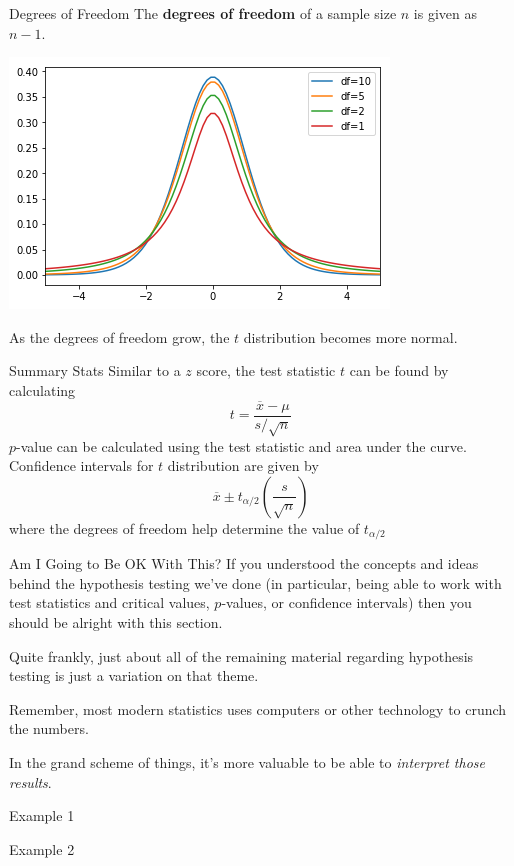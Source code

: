 \documentclass[t]{beamer}
\begin{document}
\begin{frame}{Degrees of Freedom}
The \textbf{degrees of freedom} of a sample size $n$ is given as $n - 1$.	\pause

\begin{center}
\includegraphics[scale=0.6]{../Images/t_distribution_df.png}
\end{center}
\pause

As the degrees of freedom grow, the $t$ distribution becomes more normal.
\end{frame}

\begin{frame}{Summary Stats}
Similar to a $z$ score, the test statistic $t$ can be found by calculating
\[t = \frac{\overline{x}-\mu}{s/\sqrt{n}}\]
\pause
$p$-value can be calculated using the test statistic and area under the curve. \newline\\	\pause
Confidence intervals for $t$ distribution are given by
\[\overline{x} \pm t_{\alpha/2}\left(\frac{s}{\sqrt{n}}\right)\]
where the degrees of freedom help determine the value of $t_{\alpha/2}$
\end{frame}

\begin{frame}{Am I Going to Be OK With This?}
If you understood the concepts and ideas behind the hypothesis testing we've done (in particular, being able to work with test statistics and critical values, $p$-values, or confidence intervals) then you should be alright with this section.	\newline\\	\pause

Quite frankly, just about all of the remaining material regarding hypothesis testing is just a variation on that theme.		\newline\\	\pause

Remember, most modern statistics uses computers or other technology to crunch the numbers. \newline\\	\pause

In the grand scheme of things, it's more valuable to be able to \emph{interpret those results}.
\end{frame}

\begin{frame}{Example 1}

\end{frame}

\begin{frame}{Example 2}
\end{frame}
\end{document}
